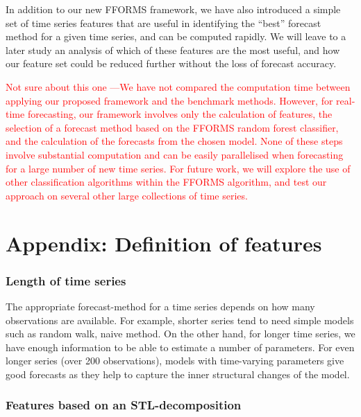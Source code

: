 \documentclass[11pt,a4paper,]{article}
\theoremstyle{definition}
\theoremstyle{definition}
\theoremstyle{definition}
\theoremstyle{remark}
\begin{document}
In addition to our new FFORMS framework, we have also introduced a
simple set of time series features that are useful in identifying the
``best'' forecast method for a given time series, and can be computed
rapidly. We will leave to a later study an analysis of which of these
features are the most useful, and how our feature set could be reduced
further without the loss of forecast accuracy.

\textcolor{red}{Not sure about this one ---We have not compared the computation time between applying our proposed framework and the benchmark methods. However, for real-time forecasting, our framework involves only the calculation of features, the selection of a forecast method based on the FFORMS random forest classifier, and the calculation of the forecasts from the chosen model. None of these steps involve substantial computation and can be easily parallelised when forecasting for a large number of new time series. For future work, we will explore the use of other classification algorithms within the FFORMS algorithm, and test our approach on several other large collections of time series.}

\hypertarget{appendix-definition-of-features}{%
\section*{Appendix: Definition of
features}\label{appendix-definition-of-features}}

\hypertarget{length-of-time-series}{%
\subsubsection*{Length of time series}\label{length-of-time-series}}

The appropriate forecast-method for a time series depends on how many
observations are available. For example, shorter series tend to need
simple models such as random walk, naive method. On the other hand, for
longer time series, we have enough information to be able to estimate a
number of parameters. For even longer series (over 200 observations),
models with time-varying parameters give good forecasts as they help to
capture the inner structural changes of the model.

\hypertarget{features-based-on-an-stl-decomposition}{%
\subsubsection*{Features based on an
STL-decomposition}\label{features-based-on-an-stl-decomposition}}
\end{document}
